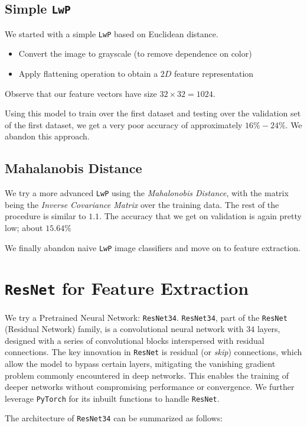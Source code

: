 \documentclass{article} %
\begin{document}
\subsection{Simple \texttt{LwP}} \label{lwp 1.1}
We started with a simple \texttt{LwP} based on Euclidean distance.
\begin{itemize}
\item Convert the image to grayscale (to remove dependence on color)
\item Apply flattening operation to obtain a $2D$ feature representation
\end{itemize}
Observe that our feature vectors have size $32 \times 32 = 1024$.

Using this model to train over the first dataset and testing over the validation set of the first dataset, we get a very poor accuracy of approximately $16\% - 24\%$. We abandon this approach.

\subsection{Mahalanobis Distance}
We try a more advanced \texttt{LwP} using the \textit{Mahalonobis Distance}, with the matrix being the \textit{Inverse Covariance Matrix} over the training data. The rest of the procedure is similar to \hyperref[lwp 1.1]{$1.1$}. The accuracy that we get on validation is again pretty low; about $15.64 \%$

We finally abandon naive \texttt{LwP} image classifiers and move on to feature extraction.

\section{\texttt{ResNet} for Feature Extraction}\label{resnet}

We try a Pretrained Neural Network: \texttt{ResNet34}. \texttt{ResNet34}, part of the \texttt{ResNet} (Residual Network) family, is a convolutional neural network with $34$ layers, designed with a series of convolutional blocks interspersed with residual connections. The key innovation in \texttt{ResNet} is residual (or \textit{skip}) connections, which allow the model to bypass certain layers, mitigating the vanishing gradient problem commonly encountered in deep networks. This enables the training of deeper networks without compromising performance or convergence. We further leverage \texttt{PyTorch} for its inbuilt functions to handle \texttt{ResNet}.

The architecture of \texttt{ResNet34} can be summarized as follows:
\end{document}
